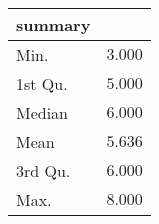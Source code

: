\begin{table}[!tbp]
\begin{center}
\begin{tabular}{lr}
\hline\hline
\multicolumn{1}{l}{summary}&\multicolumn{1}{c}{}\tabularnewline
\hline
Min.&$3.000$\tabularnewline
1st Qu.&$5.000$\tabularnewline
Median&$6.000$\tabularnewline
Mean&$5.636$\tabularnewline
3rd Qu.&$6.000$\tabularnewline
Max.&$8.000$\tabularnewline
\hline
\end{tabular}\end{center}
\end{table}
